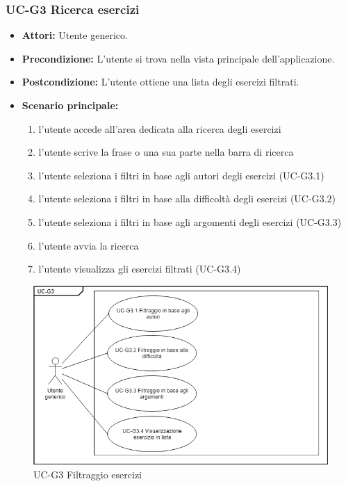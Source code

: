 	\subsubsection{UC-G3 Ricerca esercizi}
		\begin{itemize}
			\item\textbf{ Attori:} Utente generico.
			\item \textbf{Precondizione:} L'utente si trova nella vista principale dell'applicazione.
			\item \textbf{Postcondizione:} L'utente ottiene una lista degli esercizi filtrati.
			\item \textbf{Scenario principale:}
				\begin{enumerate}
					\item l'utente accede all'area dedicata alla ricerca degli esercizi
					\item l'utente scrive la frase o una sua parte nella barra di ricerca
					\item l'utente seleziona i filtri in base agli autori degli esercizi (UC-G3.1)
					\item l'utente seleziona i filtri in base alla difficoltà degli esercizi (UC-G3.2)
					\item l'utente seleziona i filtri in base agli argomenti degli esercizi (UC-G3.3)
					\item l'utente avvia la ricerca
					\item l'utente visualizza gli esercizi filtrati (UC-G3.4)
				\end{enumerate}
		\end{itemize}
		\begin{figure}[h]
			\centering
			\includegraphics[scale=0.7]{images/UC-G3.png}
			\caption{UC-G3 Filtraggio esercizi}
		\end{figure}	

